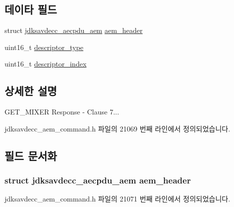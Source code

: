 \subsection*{데이타 필드}
\begin{DoxyCompactItemize}
\item 
struct \hyperlink{structjdksavdecc__aecpdu__aem}{jdksavdecc\+\_\+aecpdu\+\_\+aem} \hyperlink{structjdksavdecc__aem__command__get__mixer__response_ae1e77ccb75ff5021ad923221eab38294}{aem\+\_\+header}
\item 
uint16\+\_\+t \hyperlink{structjdksavdecc__aem__command__get__mixer__response_ab7c32b6c7131c13d4ea3b7ee2f09b78d}{descriptor\+\_\+type}
\item 
uint16\+\_\+t \hyperlink{structjdksavdecc__aem__command__get__mixer__response_a042bbc76d835b82d27c1932431ee38d4}{descriptor\+\_\+index}
\end{DoxyCompactItemize}


\subsection{상세한 설명}
G\+E\+T\+\_\+\+M\+I\+X\+ER Response -\/ Clause 7... 

jdksavdecc\+\_\+aem\+\_\+command.\+h 파일의 21069 번째 라인에서 정의되었습니다.



\subsection{필드 문서화}
\subsubsection[{\texorpdfstring{aem\+\_\+header}{aem_header}}]{\setlength{\rightskip}{0pt plus 5cm}struct {\bf jdksavdecc\+\_\+aecpdu\+\_\+aem} aem\+\_\+header}\hypertarget{structjdksavdecc__aem__command__get__mixer__response_ae1e77ccb75ff5021ad923221eab38294}{}\label{structjdksavdecc__aem__command__get__mixer__response_ae1e77ccb75ff5021ad923221eab38294}


jdksavdecc\+\_\+aem\+\_\+command.\+h 파일의 21071 번째 라인에서 정의되었습니다.

